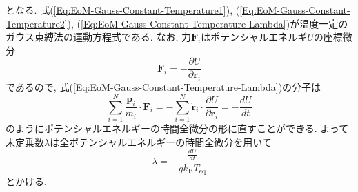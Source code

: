 となる. 式(\ref{Eq:EoM-Gauss-Constant-Temperature1}), (\ref{Eq:EoM-Gauss-Constant-Temperature2}), (\ref{Eq:EoM-Gauss-Constant-Temperature-Lambda})が温度一定のガウス束縛法の運動方程式である.
なお, 力$\bm{F}_{i}$はポテンシャルエネルギ$U$の座標微分
\begin{equation}
    \bm{F}_{i}
    =
    -
    \frac{\partial U}{\partial \bm{r}_{i}}
\end{equation}
であるので, 式(\ref{Eq:EoM-Gauss-Constant-Temperature-Lambda})の分子は
\begin{equation}
    \sum_{i=1}^{N}
    \frac{\bm{p}_{i}}{m_{i}} \cdot \bm{F}_{i}
    =
    -\sum_{i=1}^{N}
    \dot{\bm{r}}_{i} \cdot
    \frac{\partial U}{\partial \bm{r}_{i}}
    =
    -
    \frac{dU}{dt}
\end{equation}
のようにポテンシャルエネルギーの時間全微分の形に直すことができる.
よって未定乗数$\lambda$は全ポテンシャルエネルギーの時間全微分を用いて
\begin{equation}
    \lambda
    =
    -
    \frac
    {\frac{dU}{dt}}{g k_{\mathrm{B}} T_{\mathrm{eq}}}
    \label{Eq:EoM-Gauss-Constant-Temperature-Lambda2}
\end{equation}
とかける.

